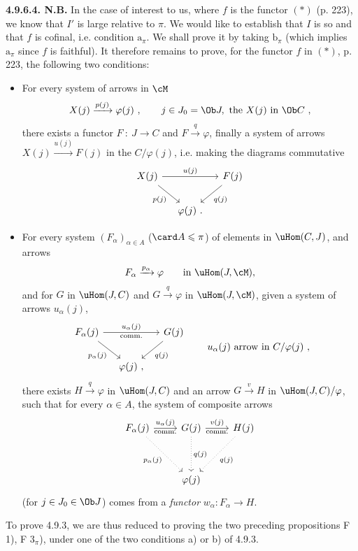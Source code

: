 \textbf{4.9.6.4. N.B.} In the case of interest to us, where $f$ is the functor $(*)$ (p. 223), we know that $I'$ is large relative to $\pi$. We would like to establish that $I$ is so and that $f$ is cofinal, i.e. condition $\mathrm{a}_\pi$. We shall prove it by taking $\mathrm{b}_\pi$ (which implies $\mathrm{a}_\pi$ since $f$ is faithful). It therefore remains to
prove, for the functor $f$ in $(*)$, p. 223, the following two conditions:
\begin{itemize}[label={}]
\item[F 1)] For every system of arrows in $\cM$
\[
X(j) \xrightarrow{p(j)} \varphi(j) \ , \qquad j \in J_0 = \Ob J, \text{ the } X(j) \text{ in } \Ob C \ ,
\]
there exists a functor $F \ : \ J \longrightarrow C$ and $F \xrightarrow{q} \varphi$, finally a system of arrows $X(j) \xrightarrow{u(j)} F(j)$ in the $C/\varphi(j)$, i.e. making the diagrams commutative %
\[
\begin{tikzcd}[column sep=small]
X(j) \arrow[rr, "u(j)"] \arrow[dr, "p(j)"'] & & F(j) \arrow[dl, "q(j)"] \\
& \varphi(j)\ . &
\end{tikzcd}
\]
\item[F $3_\pi$)] For every system $(F_\alpha)_{\alpha \in A}$ ($\card A \leqslant \pi$) of elements in $\uHom(C,J)$, and arrows %
\[
F_\alpha \xrightarrow{p_\alpha} \varphi \qquad \text{in } \uHom(J,\cM),
\]
and for $G$ in $\uHom(J,C)$ and $G \xrightarrow{q} \varphi$ in $\uHom(J,\cM)$, given a system of arrows $u_\alpha(j)$,
\[
\begin{tikzcd}[column sep=small]
F_\alpha(j) \arrow[rr, "u_\alpha(j)", "\text{comm.}"'] \arrow[dr, "p_\alpha(j)"'] & & G(j) \arrow[dl, "q(j)"] \\
& \varphi(j)\ , &
\end{tikzcd}
\qquad u_\alpha(j) \text{ arrow in } C/\varphi(j) \ ,
\]
there exists $H \xrightarrow{q} \varphi$ in $\uHom(J,C)$ and an arrow $G \xrightarrow{v} H$ in $\uHom(J,C)/\varphi$, such that for every $\alpha \in A$, the system of composite arrows
\[
\begin{tikzcd}[row sep=huge]
F_\alpha(j) \arrow[r, "u_\alpha(j)", "\text{comm.}"'] \arrow[dr, dotted, "p_\alpha(j)"'] & G(j) \arrow[r, "v(j)", "\text{comm.}"'] \arrow[d, dotted, "q(j)"] & H(j) \arrow[dl, dotted, "q(j)"] \\
& \varphi(j) &
\end{tikzcd}
\]
(for $j \in J_0 \in \Ob J$) comes from a \textit{functor} $w_\alpha : F_\alpha \longrightarrow H$. %
\end{itemize}
To prove 4.9.3, we are thus reduced to proving the two preceding propositions F 1), F $3_\pi$), under one of the two conditions a) or b) of 4.9.3.

